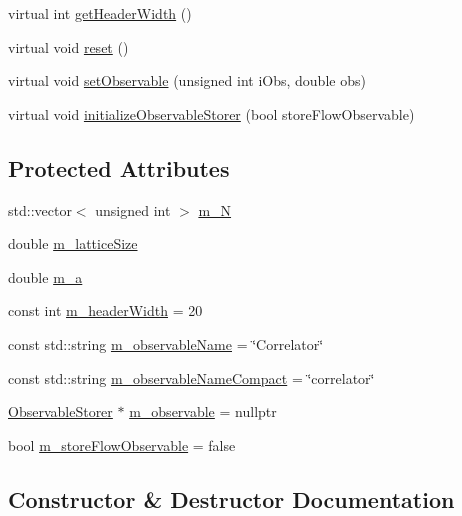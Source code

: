 \begin{DoxyCompactItemize}
\item 
virtual int \mbox{\hyperlink{class_correlator_a76375274cb578f48b9d51489ca8cd503}{get\+Header\+Width}} ()
\item 
virtual void \mbox{\hyperlink{class_correlator_aacca40262d2cd62f0a3964e832f948c1}{reset}} ()
\item 
virtual void \mbox{\hyperlink{class_correlator_adea33006fd850314004c320c258d9ec6}{set\+Observable}} (unsigned int i\+Obs, double obs)
\item 
virtual void \mbox{\hyperlink{class_correlator_ab99886c09dd27dfc8676d0032cecf9bc}{initialize\+Observable\+Storer}} (bool store\+Flow\+Observable)
\end{DoxyCompactItemize}
\subsection*{Protected Attributes}
\begin{DoxyCompactItemize}
\item 
std\+::vector$<$ unsigned int $>$ \mbox{\hyperlink{class_correlator_a524ca5c4fb6eb1e5eb0e7e766cab883c}{m\+\_\+N}}
\item 
double \mbox{\hyperlink{class_correlator_a8aca926ff9e4fe5fbc561d40a9fd513b}{m\+\_\+lattice\+Size}}
\item 
double \mbox{\hyperlink{class_correlator_ab1ba5ec775336ad0ed5fec85a21bdc9b}{m\+\_\+a}}
\item 
const int \mbox{\hyperlink{class_correlator_aba970dc6dafca82a4ebcb11812c86029}{m\+\_\+header\+Width}} = 20
\item 
const std\+::string \mbox{\hyperlink{class_correlator_abfd6599333d4ca222964ea36c7339f5c}{m\+\_\+observable\+Name}} = \char`\"{}Correlator\char`\"{}
\item 
const std\+::string \mbox{\hyperlink{class_correlator_ad5cbec48d095ae66da43c25b6a99474f}{m\+\_\+observable\+Name\+Compact}} = \char`\"{}correlator\char`\"{}
\item 
\mbox{\hyperlink{class_observable_storer}{Observable\+Storer}} $\ast$ \mbox{\hyperlink{class_correlator_a031c43c74c22d6b6308182228c32c5e7}{m\+\_\+observable}} = nullptr
\item 
bool \mbox{\hyperlink{class_correlator_aac0590e0ae6e3edc790279931b06a03c}{m\+\_\+store\+Flow\+Observable}} = false
\end{DoxyCompactItemize}


\subsection{Constructor \& Destructor Documentation}
\mbox{\label{class_correlator_aff48ef3bf789e9c6231eacc21cd9ed9a}} 
